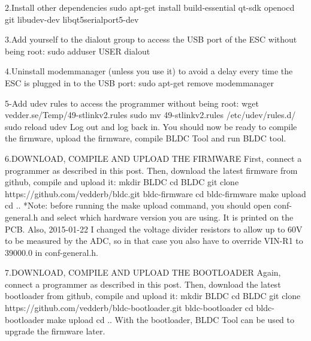 \documentclass[11pt]{article}
\begin{document}
2.Install other dependencies\newline
sudo apt-get install build-essential qt-sdk openocd git libudev-dev libqt5serialport5-dev\newline

3.Add yourself to the dialout group to access the USB port of the ESC without being root:\newline
sudo adduser USER dialout\newline

4.Uninstall modemmanager (unless you use it) to avoid a delay every time the ESC is plugged in to the USB port:\newline
sudo apt-get remove modemmanager\newline

5-Add udev rules to access the programmer without being root:\newline
wget vedder.se/Temp/49-stlinkv2.rules\newline
sudo mv 49-stlinkv2.rules /etc/udev/rules.d/\newline
sudo reload udev\newline
Log out and log back in. You should now be ready to compile the firmware, upload the firmware, compile BLDC Tool and run BLDC tool.\newline

6.DOWNLOAD, COMPILE AND UPLOAD THE FIRMWARE\newline
First, connect a programmer as described in this post. Then, download the latest firmware from github, compile and upload it:\newline
mkdir BLDC\newline
cd BLDC\newline
git clone https://github.com/vedderb/bldc.git bldc-firmware\newline
cd bldc-firmware\newline
make upload cd ..\newline
*Note: before running the make upload command, you should open conf-general.h and select which hardware version you are using. It is printed on the PCB. Also, 2015-01-22 I changed the voltage divider resistors to allow up to 60V to be measured by the ADC, so in that case you also have to override VIN-R1 to 39000.0 in conf-general.h.\newline

7.DOWNLOAD, COMPILE AND UPLOAD THE BOOTLOADER\newline
Again, connect a programmer as described in this post. Then, download the latest bootloader from github, compile and upload it:\newline
mkdir BLDC\newline
cd BLDC\newline
git clone https://github.com/vedderb/bldc-bootloader.git bldc-bootloader\newline
cd bldc-bootloader\newline
make upload  cd ..\newline
With the bootloader, BLDC Tool can be used to upgrade the firmware later.\newline
\end{document}
